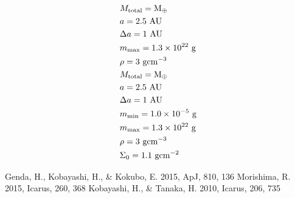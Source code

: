 \documentclass[11pt,a4paper,oneside,onecolumn]{jreport}
\begin{document}
\begin{align}
 &M_{\rm total} = {\rm M_{\oplus}}\\ 
 &a = 2.5\ {\rm AU}\\ 
 &\Delta a = 1\ {\rm AU}\\ 
 &m_{\rm max} = 1.3 \times 10^{22}\ {\rm g}\\ 
 &\rho = 3\ {\rm g cm^{-3}}\\
 &M_{\rm total} = {\rm M_{\oplus}}\\ 
 &a = 2.5\ {\rm AU}\\ 
 &\Delta a = 1\ {\rm AU}\\
 &m_{\rm min} = 1.0 \times 10^{-5}\ {\rm g}\\
 &m_{\rm max} = 1.3 \times 10^{22}\ {\rm g}\\ 
 &\rho = 3\ {\rm g cm^{-3}}\\
 &\Sigma_0 = 1.1\ {\rm g cm^{-2}} 
\end{align}
 
 
 \clearpage
\begin{thebibliography}{9}
  Genda, H., Kobayashi, H., \& Kokubo, E. 2015, ApJ, 810, 136
  Morishima, R. 2015, Icarus, 260, 368
  Kobayashi, H., \& Tanaka, H. 2010, Icarus, 206, 735
\end{thebibliography}
\end{document}
